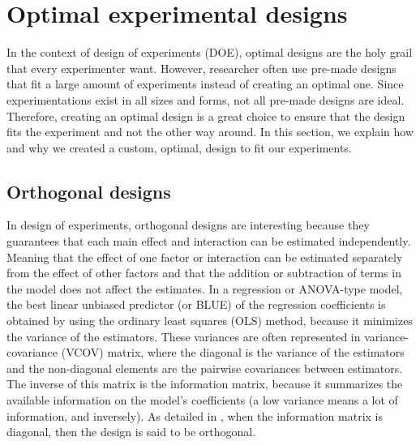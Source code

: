
\section{Optimal experimental designs}
In the context of design of experiments (DOE), optimal designs are the holy grail that every experimenter want. However, researcher often use pre-made designs that fit a large amount of experiments instead of creating an optimal one. Since experimentations exist in all sizes and forms, not all pre-made designs are ideal. Therefore, creating an optimal design is a great choice to ensure that the design fits the experiment and not the other way around. In this section, we explain how and why we created a custom, optimal, design to fit our experiments.

\subsection{Orthogonal designs}
In design of experiments, orthogonal designs are interesting because they guarantees that each main effect and interaction can 
be estimated independently. Meaning that the effect of one factor or interaction can be estimated separately from the effect of 
other factors
and that the addition or subtraction of terms in the model does not affect the estimates.
In a regression or ANOVA-type model, the best linear unbiased predictor (or BLUE) of the regression coefficients is obtained by 
using 
the ordinary least squares (OLS) method, because it minimizes the variance of the estimators. 
These variances are often represented in variance-covariance (VCOV) matrix, 
where the diagonal is the variance of the estimators and the non-diagonal elements are the pairwise covariances between 
estimators. 
The inverse of this matrix is the information matrix, 
because it summarizes the available information  on the model's coefficients (a low variance means a lot of information, and 
inversely).
As detailed in \textcite{goos_optimal_2011}, when the information matrix is diagonal, then the design is said to be orthogonal.

